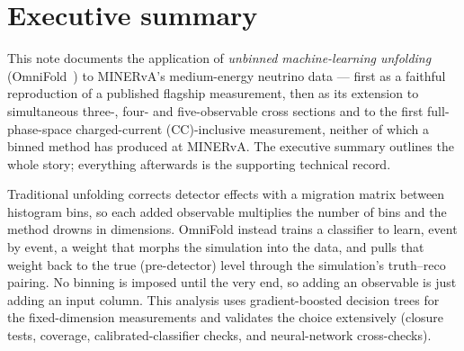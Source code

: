 \section*{Executive summary}
\label{sec:execsummary}

This note documents the application of \emph{unbinned machine-learning unfolding} (OmniFold~\cite{Andreassen:2019cjw, Andreassen:2021zzk}) to MINERvA's medium-energy neutrino data --- first as a faithful reproduction of a published flagship measurement, then as its extension to simultaneous three-, four- and five-observable cross sections and to the first full-phase-space charged-current (CC)-inclusive measurement, neither of which a binned method has produced at MINERvA. The executive summary outlines the whole story; everything afterwards is the supporting technical record.

Traditional unfolding corrects detector effects with a migration matrix between histogram bins, so each added observable multiplies the number of bins and the method drowns in dimensions. OmniFold instead trains a classifier to learn, event by event, a weight that morphs the simulation into the data, and pulls that weight back to the true (pre-detector) level through the simulation's truth--reco pairing. No binning is imposed until the very end, so adding an observable is just adding an input column. This analysis uses gradient-boosted decision trees for the fixed-dimension measurements and
validates the choice extensively (closure tests, coverage, calibrated-classifier checks, and neural-network cross-checks).

